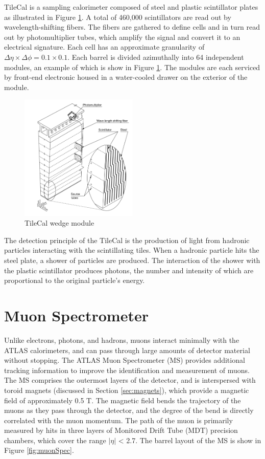 TileCal is a sampling calorimeter composed of steel and plastic scintillator plates as illustrated in Figure \ref{fig:tileCal}. A total of 460,000 scintillators are read out by wavelength-shifting fibers. The fibers are gathered to define cells and in turn read out by photomultiplier tubes, which amplify the signal and convert it to an electrical signature. Each cell has an approximate granularity of $\Delta\eta \times \Delta\phi = 0.1 \times 0.1$. Each barrel is divided azimuthally into 64 independent modules, an example of which is show in Figure \ref{fig:tileCal}. The modules are each serviced by front-end electronic housed in a water-cooled drawer on the exterior of the module. \par

\begin{figure}
        \centering
	\includegraphics[width=0.5\textwidth]{figures/ch3/tileWedge.png}
	\caption{TileCal wedge module \cite{tile_tdr} }
	\label{fig:tileCal}
\end{figure}

The detection principle of the TileCal is the production of light from hadronic particles interacting with the scintillating tiles. When a hadronic particle hits the steel plate, a shower of particles are produced. The interaction of the shower with the plastic scintillator produces photons, the number and intensity of which are proportional to the original particle's energy. \\

\section{Muon Spectrometer}
Unlike electrons, photons, and hadrons, muons interact minimally with the ATLAS calorimeters, and can pass through large amounts of detector material without stopping. The ATLAS Muon Spectrometer (MS) provides additional tracking information to improve the identification and measurement of muons. The MS comprises the outermost layers of the detector, and is interspersed with toroid magnets (discussed in Section \ref{sec:magnets}), which provide a magnetic field of approximately 0.5 T. The magnetic field bends the trajectory of the muons as they pass through the detector, and the degree of the bend is directly correlated with the muon momentum. The path of the muon is primarily measured by hits in three layers of Monitored Drift Tube (MDT) precision chambers, which cover the range $|\eta|$ < 2.7. The barrel layout of the MS is show in Figure \ref{fig:muonSpec}. \par

